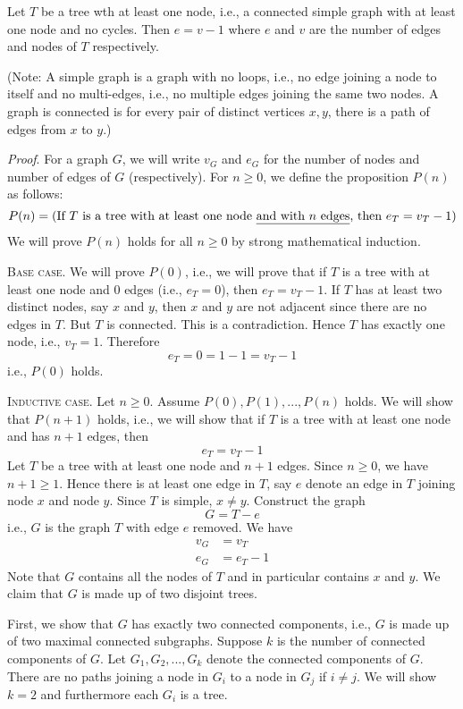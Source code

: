 \newpage
\begin{thm}
  Let $T$ be a tree wth at least one node,
  i.e., a connected simple graph with at least one node and no cycles.
  Then $e = v - 1$ where $e$ and $v$ are the number of edges and
  nodes of $T$ respectively.
\end{thm}

(Note: A simple graph is a graph with no loops, i.e., no edge
joining a node to itself and no multi-edges, i.e., no multiple edges
joining the same two nodes.
A graph is connected is for every pair of distinct vertices $x,y$,
there is a path of edges from $x$ to $y$.)

\textit{Proof}.
For a graph $G$, we will write $v_G$ and $e_G$ for the number of
nodes and number of edges of $G$ (respectively).
For $n \geq 0$, we define the proposition $P(n)$ as follows:
\[
  P(n) = 
  (
  \text{If $T$ is a tree with at least one node
  \underline{and with $n$ edges}, then $e_T = v_T - 1$}
  )
\]
We will prove $P(n)$ holds for all $n \geq 0$ by strong mathematical induction.

\textsc{Base case}.
We will prove $P(0)$, i.e., we will prove that
if $T$ is a tree with at least one node and 
$0$ edges (i.e., $e_T = 0$), then $e_T = v_T - 1$.
If $T$ has at least two distinct nodes,
say $x$ and $y$, then $x$ and $y$ are not adjacent since there are
no edges in $T$.
But $T$ is connected.
This is a contradiction.
Hence $T$ has exactly one node, i.e., $v_T = 1$.
Therefore
\[
e_T = 0 = 1 - 1 = v_T - 1
\]
i.e., $P(0)$ holds.

\textsc{Inductive case}.
Let $n \geq 0$.
Assume $P(0), P(1), ..., P(n)$ holds.
We will show that $P(n + 1)$ holds, i.e., we will show that
if $T$ is a tree with at least one node and has $n + 1$ edges, then
\[
  e_T = v_T - 1
\]
Let $T$ be a tree with at least one node and $n + 1$ edges.
Since $n \geq 0$, we have $n + 1 \geq 1$.
Hence there is at least one edge in $T$, say
$e$ denote an edge in $T$ joining node $x$ and node $y$.
Since $T$ is simple, $x \neq y$.
Construct the graph
\[
  G = T - e
\]
i.e., $G$ is the graph $T$ with edge $e$ removed.
We have
\begin{align*}
  v_G &= v_T \\
  e_G &= e_T - 1 
\end{align*}
Note that $G$ contains all the nodes of $T$ and in particular
contains $x$ and $y$.
We claim that $G$ is made up of two disjoint trees.

First, we show that $G$ has exactly two connected components, i.e.,
$G$ is made up of two maximal connected subgraphs.
Suppose $k$ is the number of connected components of $G$.
Let $G_1, G_2, ..., G_k$ denote the connected components of $G$.
There are no paths joining a node in $G_i$ to a node in $G_j$ if $i \neq j$.
We will show $k = 2$ and furthermore each $G_i$ is a tree.


